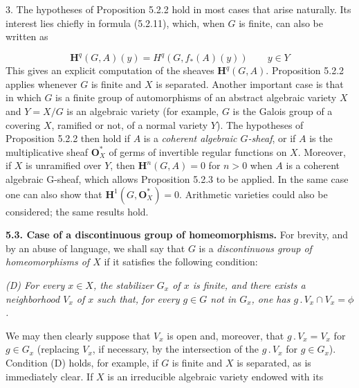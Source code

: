 3. The hypotheses of Proposition 5.2.2 hold in most cases that
arise naturally. Its interest lies chiefly in formula (5.2.11), which, when
$G$ is finite, can also be written as

\[
\mathbf H^q(G,A)(y)=H^q(G,f_*(A)(y))\qquad y\in Y
\tag{5.2.11 bis}
\]
This gives an explicit computation of the sheaves $\mathbf H^q(G,A)$.
Proposition 5.2.2 applies whenever $G$ is finite and $X$ is separated. Another
important case is that in which $G$ is a finite group of automorphisms of an
abstract algebraic variety $X$ and $Y=X/G$ is an algebraic variety (for
example, $G$ is the Galois group of a covering $X$, ramified or not, of a
normal variety $Y$). The hypotheses of Proposition 5.2.2 then hold if $A$ is
a \textit{coherent algebraic $G$-sheaf}, or if $A$ is the multiplicative
sheaf $\mathbf O_X^*$ of germs of invertible regular functions on $X$.
Moreover, if $X$ is unramified over $Y$, then $\mathbf H^n(G,A)=0$ for $n>0$
when $A$ is a coherent algebraic G-sheaf, which allows Proposition 5.2.3 to
be applied. In the same case one can also show that
$\mathbf H^1(G,\mathbf O_X^*)=0$. Arithmetic varieties could also be
considered; the same results hold.

\bigskip
\textbf{5.3. Case of a discontinuous group of homeomorphisms.} For
brevity, and by an abuse of language, we shall say that $G$ is a
\textit{discontinuous group of homeomorphisms of $X$} if it satisfies the
following condition:

\textit{\textup{(D)} For every $x\in X$, the stabilizer $G_x$ of $x$ is
finite, and there exists a neighborhood $V_x$ of $x$ such that, for every
$g\in G$ not in $G_x$, one has $g\mathbin{.}V_x\cap V_x=\phi$.}

We may then clearly suppose that $V_x$ is open and, moreover, that
$g\mathbin{.}V_x=V_x$ for $g\in G_x$ (replacing $V_x$, if necessary, by the
intersection of the $g\mathbin{.}V_x$ for $g\in G_x$). Condition (D) holds, for
example, if $G$ is finite and $X$ is separated, as is immediately clear. If
$X$ is an irreducible algebraic variety endowed with its

